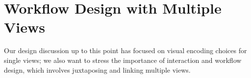 \documentclass[journal]{vgtc}                %
\begin{document}





\section{Workflow Design with Multiple Views}
\label{design:workflows}


Our design discussion up to this point has focused on visual encoding choices for single views; we also want to stress the importance of interaction and workflow design, which involves juxtaposing and linking multiple views.
\end{document}
